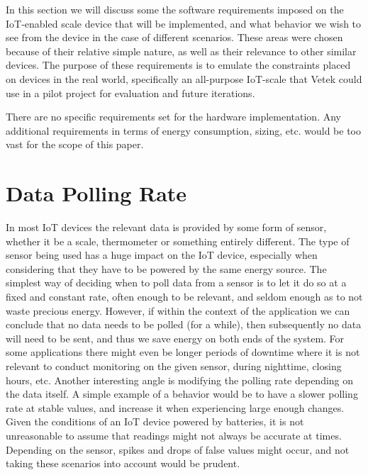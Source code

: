 





In this section we will discuss some the software requirements imposed on the IoT-enabled scale device that will be implemented, and what behavior we wish to see from the device in the case of different scenarios. These areas were chosen because of their relative simple nature, as well as their relevance to other similar devices. The purpose of these requirements is to emulate the constraints placed on devices in the real world, specifically an all-purpose IoT-scale that Vetek could use in a pilot project for evaluation and future iterations. 

There are no specific requirements set for the hardware implementation. Any additional requirements in terms of energy consumption, sizing, etc. would be too vast for the scope of this paper. 

\section{Data Polling Rate}
In most IoT devices the relevant data is provided by some form of sensor, whether it be a scale, thermometer or something entirely different.\cite{what_is_iot} The type of sensor being used has a huge impact on the IoT device, especially when considering that they have to be powered by the same energy source. The simplest way of deciding when to poll data from a sensor is to let it do so at a fixed and constant rate, often enough to be relevant, and seldom enough as to not waste precious energy. However, if within the context of the application we can conclude that no data needs to be polled (for a while), then subsequently no data will need to be sent, and thus we save energy on both ends of the system. For some applications there might even be longer periods of downtime where it is not relevant to conduct monitoring on the given sensor, \eg during nighttime, closing hours, etc. Another interesting angle is modifying the polling rate depending on the data itself. A simple example of a behavior would be to have a slower polling rate at stable values, and increase it when experiencing large enough changes. Given the conditions of an IoT device powered by batteries, it is not unreasonable to assume that readings might not always be accurate at times. Depending on the sensor, spikes and drops of false values might occur, and not taking these scenarios into account would be prudent. 

